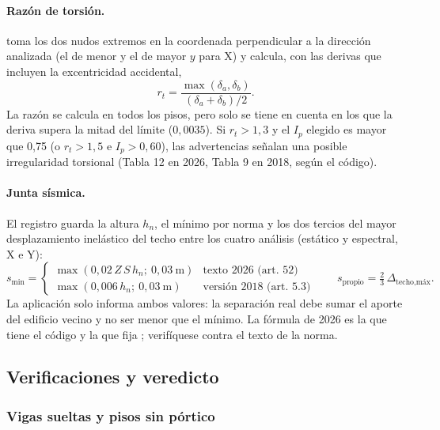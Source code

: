 \paragraph{Razón de torsión.}  toma los dos nudos extremos en la coordenada
perpendicular a la dirección analizada (el de menor y el de mayor $y$ para X) y calcula, con las derivas que incluyen la
excentricidad accidental,
\begin{equation}
	r_t = \frac{\max(\delta_a, \delta_b)}{(\delta_a + \delta_b)/2} .
	\label{eq:sis-razon}
\end{equation}
La razón se calcula en todos los pisos, pero solo se tiene en cuenta en los que la deriva supera la mitad del límite
($0{,}0035$). Si $r_t > 1{,}3$ y el $I_p$
elegido es mayor que 0,75 (o $r_t > 1{,}5$ e $I_p > 0{,}60$), las advertencias señalan una posible irregularidad
torsional (Tabla 12 en 2026, Tabla 9 en 2018, según el código).

\paragraph{Junta sísmica.} El registro  guarda la altura $h_n$, el mínimo por norma y los dos tercios del
mayor desplazamiento inelástico del techo entre los cuatro análisis (estático y espectral, X e Y):
\begin{equation}
	s_{\min} = \begin{cases} \max(0{,}02\,Z\,S\,h_n;\ 0{,}03~\text{m}) & \text{texto 2026 (art. 52)} \\
		\max(0{,}006\,h_n;\ 0{,}03~\text{m}) & \text{versión 2018 (art. 5.3)} \end{cases}
	\qquad s_{\text{propio}} = \tfrac{2}{3}\,\Delta_{\text{techo,máx}} .
	\label{eq:sis-junta}
\end{equation}
La aplicación solo informa ambos valores: la separación real debe sumar el aporte del edificio vecino y no ser menor que
el mínimo. La fórmula de 2026 es la que tiene el código y la que fija ; verifíquese contra el texto
de la norma.

\subsection{Verificaciones y veredicto}
\label{sec:sis-verificaciones}

\subsubsection{Vigas sueltas y pisos sin pórtico}

